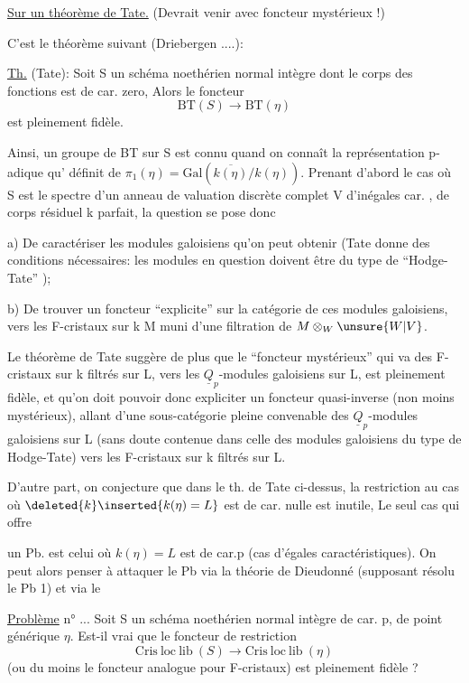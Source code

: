 \uline{Sur un théorème de Tate.} (Devrait venir avec foncteur mystérieux !)

C'est le théorème suivant (Driebergen ....):

\uline{Th.} (Tate): Soit S un schéma noethérien normal intègre dont le corps des fonctions  est de car. zero, Alors le foncteur
\[
\mathrm{BT}(S)\longrightarrow\mathrm{BT}(\eta)
\]
est pleinement fidèle.

Ainsi, un groupe de BT sur S est connu  quand on connaît la représentation p-adique qu' définit de $\pi_1(\eta)=\mathrm{Gal}(\overline{k(\eta)}/k(\eta))$. Prenant d'abord le cas où S est le spectre d'un anneau de valuation discrète complet V d'inégales car. , de corps  résiduel k parfait, la question se pose donc

a) De caractériser les modules galoisiens qu'on peut obtenir (Tate donne des conditions nécessaires: les modules en question doivent être du type de ``Hodge-Tate'' );

b) De trouver un foncteur ``explicite'' sur la catégorie de ces modules galoisiens, vers les F-cristaux sur k M muni d'une filtration de $M\otimes_W\unsure{W|V}$.

Le théorème de Tate suggère de plus que le ``foncteur mystérieux'' qui va des F-cristaux sur k filtrés sur L, vers les $\underline{Q}_p$-modules galoisiens sur L, est pleinement fidèle, et qu'on doit pouvoir donc  expliciter un foncteur quasi-inverse (non moins mystérieux), allant d'une sous-catégorie pleine convenable des $\underline{Q}_p$-modules galoisiens sur L (sans doute contenue dans celle des modules galoisiens du type de Hodge-Tate) vers les F-cristaux sur k filtrés sur L.

D'autre part, on conjecture que dans le th. de Tate ci-dessus, la restriction au cas où $\deleted{k}\inserted{k(\eta)=L}$ est de car. nulle est inutile, Le seul cas qui offre

un Pb. est celui où $k(\eta)=L$ est de car.p (cas d'égales caractéristiques). On peut alors penser à attaquer le Pb via la théorie de Dieudonné (supposant résolu le Pb 1) et via le

\uline{Problème} n° ... Soit S un schéma noethérien normal  intègre de car. p, de point générique $\eta$. Est-il vrai que le foncteur de restriction
\[
\mathrm{Cris\ loc\ lib}\ (S)\longrightarrow\mathrm{Cris\ loc\ lib}\ (\eta)
\]
(ou du moins le foncteur analogue pour F-cristaux) est pleinement fidèle ?

